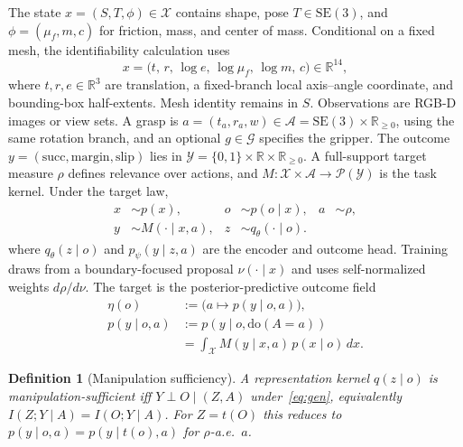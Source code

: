 \documentclass[letterpaper, 10pt, conference]{ieeeconf}
\newtheorem{definition}{Definition}
\newcommand{\R}{\mathbb{R}}
\newcommand{\suff}{\mathrm{succ}}
\begin{document}
The state $x=(S,T,\phi)\in\mathcal X$ contains shape, pose
$T\in\mathrm{SE}(3)$, and $\phi=(\mu_f,m,c)$ for friction, mass, and center
of mass. Conditional on a fixed mesh, the identifiability calculation uses
\begin{equation}
x=\bigl(t,\,r,\,\log e,\,\log \mu_f,\,\log m,\,c\bigr)\in\R^{14},
\label{eq:state}
\end{equation}
where $t,r,e\in\R^3$ are translation, a fixed-branch local axis--angle
coordinate, and bounding-box half-extents. Mesh identity remains in $S$.
Observations are RGB-D images or view sets. A grasp is
$a=(t_a,r_a,w)\in\mathcal A=\mathrm{SE}(3)\times\R_{\ge0}$, using the same
rotation branch, and an optional $g\in\mathcal G$ specifies the gripper. The
outcome $y=(\suff,\mathrm{margin},\mathrm{slip})$ lies in
$\mathcal Y=\{0,1\}\times\R\times\R_{\ge0}$. A full-support target measure
$\rho$ defines relevance over actions, and
$M:\mathcal X\times\mathcal A\to\mathcal P(\mathcal Y)$ is the task kernel.
Under the target law,
\begin{equation}
\begin{aligned}
x&\sim p(x), & o&\sim p(o\mid x), & a&\sim\rho,\\
y&\sim M(\cdot\mid x,a), & z&\sim q_\theta(\cdot\mid o).&&
\end{aligned}
\label{eq:gen}
\end{equation}
where $q_\theta(z\mid o)$ and $p_\psi(y\mid z,a)$ are the encoder and outcome head.
Training draws from a boundary-focused proposal $\nu(\cdot\mid x)$ and uses
self-normalized weights $d\rho/d\nu$. The target is the posterior-predictive
outcome field
\begin{equation}
\begin{aligned}
\eta(o)&:=\bigl(a\mapsto p(y\mid o,a)\bigr),\\
p(y\mid o,a)&:=p(y\mid o,\mathrm{do}(A=a))\\
&=\int_{\mathcal{X}} M(y\mid x,a)\,p(x\mid o)\,dx.
\end{aligned}
\label{eq:eta}
\end{equation}

\begin{definition}[Manipulation sufficiency]
\label{def:sufficiency}
A representation kernel $q(z\mid o)$ is manipulation-sufficient iff
$Y\perp O\mid(Z,A)$ under~\eqref{eq:gen}, equivalently
$I(Z;Y\mid A)=I(O;Y\mid A)$. For $Z=t(O)$ this reduces to
$p(y\mid o,a)=p(y\mid t(o),a)$ for $\rho$-a.e.\ $a$.
\end{definition}
\end{document}
